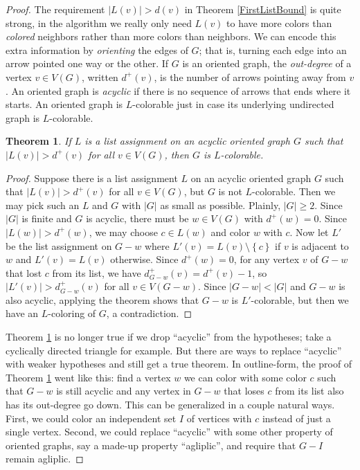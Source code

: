 \documentclass{amsbook}
\theoremstyle{plain}
\newtheorem{theorem}{Theorem}
\numberwithin{equation}{chapter}
\newcommand{\set}[1]{\left\{ #1 \right\}}
\newcommand{\card}[1]{\left|#1\right|}
\begin{document}
\begin{proof}
The requirement $\card{L(v)} > d(v)$ in Theorem \ref{FirstListBound} is quite strong, in the algorithm we really only need $L(v)$ to have more colors 
than \emph{colored} neighbors rather than more colors than neighbors.  We can encode this extra information by \emph{orienting} the edges of $G$; that is, turning
each edge into an arrow pointed one way or the other.  If $G$ is an oriented graph, the \emph{out-degree} of a vertex $v \in V(G)$, written $d^+(v)$, is the number of arrows
pointing away from $v$.  An oriented graph is \emph{acyclic} if there is no sequence of arrows that ends where it starts.  An oriented graph is $L$-colorable just in case its
underlying undirected graph is $L$-colorable.

\begin{theorem}\label{SecondListBound}
If $L$ is a list assignment on an acyclic oriented graph $G$ such that $\card{L(v)} > d^+(v)$ for all $v \in V(G)$, then $G$ is $L$-colorable.
\end{theorem}
\begin{proof}
Suppose there is a list assignment $L$ on an acyclic oriented graph $G$ such that $\card{L(v)} > d^+(v)$ for all $v \in V(G)$, but $G$ is not $L$-colorable.  Then
we may pick such an $L$ and $G$ with $\card{G}$ as small as possible.  Plainly, $\card{G} \ge 2$. Since $\card{G}$ is finite and $G$ is acyclic, there must be $w \in V(G)$ with $d^+(w) = 0$.
Since $\card{L(w)} > d^+(w)$, we may choose $c \in L(w)$ and color $w$ with $c$.  Now let $L'$ be the list assignment on $G-w$ where $L'(v) = L(v) \setminus \set{c}$ if $v$
is adjacent to $w$ and $L'(v) = L(v)$ otherwise.  Since $d^+(w) = 0$, for any vertex $v$ of $G-w$ that lost $c$ from its list, we have $d_{G-w}^+(v) = d^+(v) - 1$, so 
$\card{L'(v)} > d_{G-w}^+(v)$ for all $v \in V(G-w)$.  Since $\card{G-w} < \card{G}$ and $G-w$ is also acyclic, applying the theorem shows that $G-w$ is $L'$-colorable, but then we have an $L$-coloring
of $G$, a contradiction.
\end{proof}

Theorem \ref{SecondListBound} is no longer true if we drop ``acyclic'' from the hypotheses; take a cyclically directed triangle for example.  
But there are ways to replace ``acyclic'' with weaker hypotheses and still get a true theorem.  In outline-form, the proof of Theorem \ref{SecondListBound} went like this: 
find a vertex $w$ we can color with some color $c$ such that $G-w$ is still acyclic and any vertex in $G-w$ that loses $c$ from its list also has its out-degree go down. 
This can be generalized in a couple natural ways.  First, we could color an independent set $I$ of vertices with $c$ instead of just a single vertex.  Second, we could replace ``acyclic'' with
some other property of oriented graphs, say a made-up property ``agliplic'', and require that $G-I$ remain agliplic.


\end{proof}
\end{document}
